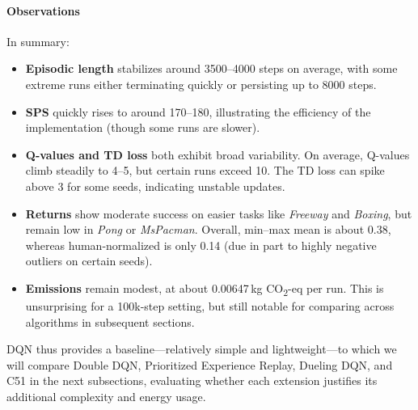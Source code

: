 \paragraph{Observations}
In summary:
\begin{itemize}
	\item \textbf{Episodic length} stabilizes around 3500--4000 steps on average, 
	with some extreme runs either terminating quickly or persisting up to 8000 steps.
	\item \textbf{SPS} quickly rises to around 170--180, illustrating the efficiency 
	of the implementation (though some runs are slower).
	\item \textbf{Q-values and TD loss} both exhibit broad variability. On average, 
	Q-values climb steadily to 4--5, but certain runs exceed 10. The TD loss 
	can spike above 3 for some seeds, indicating unstable updates.
	\item \textbf{Returns} show moderate success on easier tasks like \textit{Freeway} 
	and \textit{Boxing}, but remain low in \textit{Pong} or \textit{MsPacman}. Overall, 
	min--max mean is about 0.38, whereas human-normalized is only 0.14 (due in part 
	to highly negative outliers on certain seeds).
	\item \textbf{Emissions} remain modest, at about 0.00647\,kg CO\textsubscript{2}-eq 
	per run. This is unsurprising for a 100k-step setting, but still notable for 
	comparing across algorithms in subsequent sections.
\end{itemize}

DQN thus provides a baseline—relatively simple and lightweight—to which we will 
compare Double DQN, Prioritized Experience Replay, Dueling DQN, and C51 
in the next subsections, evaluating whether each extension justifies 
its additional complexity and energy usage.


